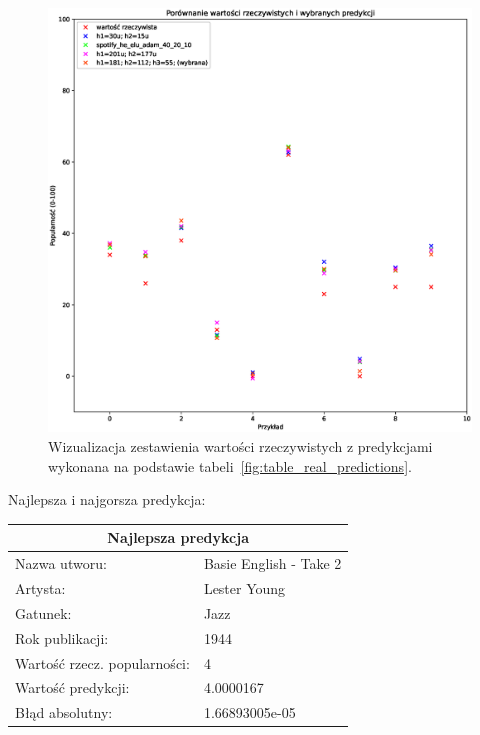 \documentclass[a4paper,12pt]{article}
\numberwithin{figure}{section}
\begin{document}
    \smallskip

    \begin{figure}[H]
        \centering
        \includegraphics[width=\textwidth]{compr_samples_real_predictions}
        \caption{Wizualizacja zestawienia wartości rzeczywistych z predykcjami wykonana na podstawie tabeli~\ref{fig:table_real_predictions}.}
        \label{fig:compr_samples_real_predictions}
    \end{figure}

    \bigskip

    Najlepsza i najgorsza predykcja:

    \bigskip

    \noindent
    \begin{minipage}[H]{\textwidth}
        \begin{tabular}{|p{}|p{}|}
            \hline
            \multicolumn{2}{|c|}{Najlepsza predykcja} \\
            \hline
            Nazwa utworu:                & Basie English - Take 2 \\
            Artysta:                     & Lester Young           \\
            Gatunek:                     & Jazz                   \\
            Rok publikacji:              & 1944                   \\
            Wartość rzecz. popularności: & 4                      \\
            Wartość predykcji:           & 4.0000167              \\
            Błąd absolutny:              & 1.66893005e-05         \\
            \hline
        \end{tabular}
    \end{minipage}
\end{document}
